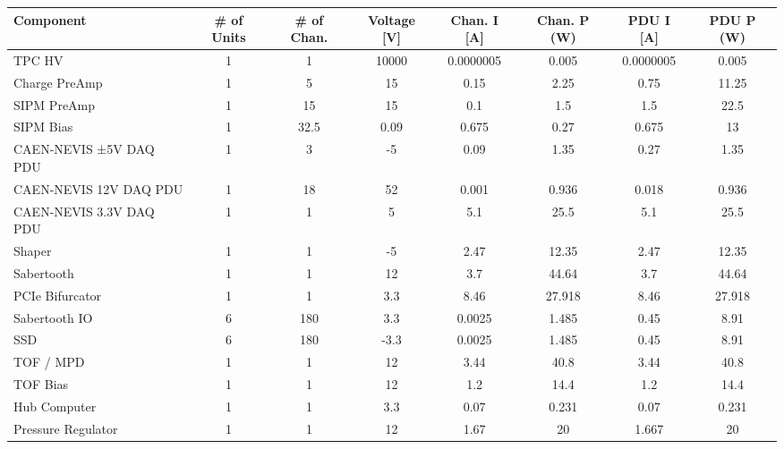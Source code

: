 \begin{landscape}
\begin{table}
\centering
\small
\setlength{\tabcolsep}{0pt}
\begin{tabular*}{\textwidth}{@{\extracolsep{\fill}} lccccccc @{}}
\toprule
\textbf{Component} & \textbf{\# of Units} & \textbf{\# of Chan.} & \textbf{Voltage [V]} & \textbf{Chan. I [A]} & \textbf{Chan. P (W)} & \textbf{PDU I [A]} & \textbf{PDU P (W)} \\
\midrule
TPC HV                  & 1 & 1   & 10000 & 0.0000005 & 0.005 & 0.0000005 & 0.005 \\
Charge PreAmp           & 1 & 5   & 15    & 0.15      & 2.25  & 0.75      & 11.25 \\
SIPM PreAmp             & 1 & 15  & 15    & 0.1       & 1.5   & 1.5       & 22.5  \\
SIPM Bias               & 1 & 32.5& 0.09  & 0.675     & 0.27  & 0.675     & 13    \\
CAEN-NEVIS ±5V DAQ PDU  & 1 & 3   & -5    & 0.09      & 1.35  & 0.27      & 1.35  \\
CAEN-NEVIS 12V DAQ PDU  & 1 & 18  & 52    & 0.001     & 0.936 & 0.018     & 0.936 \\
CAEN-NEVIS 3.3V DAQ PDU & 1 & 1   & 5     & 5.1       & 25.5  & 5.1       & 25.5  \\
Shaper                  & 1 & 1   & -5    & 2.47      & 12.35 & 2.47      & 12.35 \\
Sabertooth              & 1 & 1   & 12    & 3.7       & 44.64 & 3.7       & 44.64 \\
PCIe Bifurcator         & 1 & 1   & 3.3   & 8.46      & 27.918& 8.46      & 27.918\\
Sabertooth IO           & 6 & 180 & 3.3   & 0.0025    & 1.485 & 0.45      & 8.91  \\
SSD                     & 6 & 180 & -3.3  & 0.0025    & 1.485 & 0.45      & 8.91  \\
TOF / MPD               & 1 & 1   & 12    & 3.44      & 40.8  & 3.44      & 40.8  \\
TOF Bias                & 1 & 1   & 12    & 1.2       & 14.4  & 1.2       & 14.4  \\
Hub Computer            & 1 & 1   & 3.3   & 0.07      & 0.231 & 0.07      & 0.231 \\
Pressure Regulator      & 1 & 1   & 12    & 1.67      & 20    & 1.667     & 20    \\

\end{tabular*}
\end{table}
\end{landscape}

